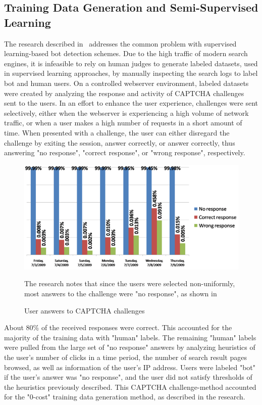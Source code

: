 \subsection{Training Data Generation and Semi-Supervised Learning}\label{subsec:training-data-generation-and-semi-supervised-learning}
The research described in~\cite{bot_detection_for_search_engines} addresses the common problem with supervised learning-based bot detection schemes.
Due to the high traffic of modern search engines, it is infeasible to rely on human judges to generate labeled datasets, used in supervised learning approaches, by manually inspecting the search logs to label bot and human users.
On a controlled webserver environment, labeled datasets were created by analyzing the response and activity of CAPTCHA challenges sent to the users.
In an effort to enhance the user experience, challenges were sent selectively, either when the webserver is experiencing a high volume of network traffic, or when a user makes a high number of requests in a short amount of time.
When presented with a challenge, the user can either disregard the challenge by exiting the session, answer correctly, or answer correctly, thus answering "no response", "correct response", or "wrong response", respectively.
\begin{figure}[!h]
    \centering
    \includegraphics[width=1\columnwidth]{figures/semi_supervised_CAPTCHA_training_data_generation_results}
    \caption{User answers to CAPTCHA challenges}
    \label{fig:captcha-user-answers}
    {\small The research notes that since the users were selected non-uniformly, most answers to the challenge were "no response", as shown in~\cite{bot_detection_for_search_engines}}
\end{figure}
About 80\% of the received responses were correct.
This accounted for the majority of the training data with "human" labels.
The remaining "human" labels were pulled from the large set of "no response" answers by analyzing heuristics of the user's number of clicks in a time period, the number of search result pages browsed, as well as information of the user's IP address.
Users were labeled "bot" if the user's answer was "no response", and the user did not satisfy thresholds of the heuristics previously described.
This CAPTCHA challenge-method accounted for the "0-cost" training data generation method, as described in the research.


